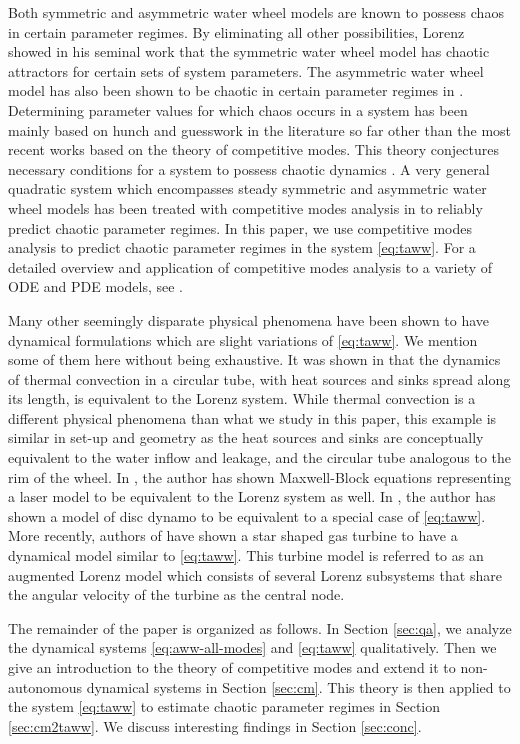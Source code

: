 Both symmetric and asymmetric water wheel models are known to possess chaos in 
certain parameter regimes. By eliminating all other possibilities, Lorenz showed 
in his seminal work \cite{Lorenz63} that the symmetric water wheel model has 
chaotic attractors for certain sets of system parameters. The asymmetric water wheel 
model has also been shown to be chaotic in certain parameter regimes in \cite{MS06}. 
Determining parameter values for which chaos occurs in a system has been mainly 
based on hunch and guesswork in the literature so far other than the most recent 
works based on the theory of competitive modes. This theory conjectures necessary conditions for a system to possess chaotic dynamics \cite{Pei06}. A very general 
quadratic system which encompasses steady symmetric and asymmetric water wheel models 
has been treated with competitive modes analysis in \cite{CG12} to reliably predict chaotic parameter 
regimes. In this paper, we use competitive modes analysis to predict chaotic 
parameter regimes in the system \eqref{eq:taww}. For a detailed overview and application of competitive modes analysis to a variety of ODE and PDE models, see \cite{LS06}. 

Many other seemingly disparate physical phenomena have been shown to have dynamical formulations which are slight variations of \eqref{eq:taww}. We mention some of them here without being exhaustive. It was shown in \cite{Malkus72} that the dynamics of thermal convection in a circular tube, with heat sources and sinks spread along its length, is equivalent to the Lorenz system. While thermal convection is a different physical phenomena than what we study in this paper, this example is similar in set-up and geometry as the heat sources and sinks are conceptually equivalent to the water inflow and leakage, and the circular tube analogous to the rim of the wheel. In \cite{Haken83}, the author has shown Maxwell-Block equations representing a laser model to be equivalent to the Lorenz system as well. In \cite{Robbins77}, the author has shown a model of disc dynamo to be equivalent to a special case of \eqref{eq:taww}. More recently, authors of \cite{CMT12} have shown a star shaped gas turbine to have a dynamical model similar to \eqref{eq:taww}. This turbine model is referred to as an augmented Lorenz model which consists of several Lorenz subsystems that share the angular velocity of the turbine as the central node.

The remainder of the paper is organized as follows. In Section \ref{sec:qa}, we analyze the dynamical systems \eqref{eq:aww-all-modes} and \eqref{eq:taww} qualitatively. Then we give an introduction to the theory of competitive modes and extend it to non-autonomous dynamical systems in Section \ref{sec:cm}. This theory is then applied to the system \eqref{eq:taww} to estimate chaotic parameter regimes in Section \ref{sec:cm2taww}. We discuss interesting findings in Section \ref{sec:conc}.

